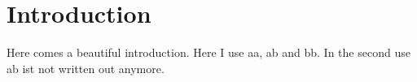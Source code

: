 \section{Introduction}
\label{ch:introduction}

Here comes a beautiful introduction.
Here I use \gls{aa}, \gls{ab} and \gls{bb}. In the second use \gls{ab} ist not written out anymore.